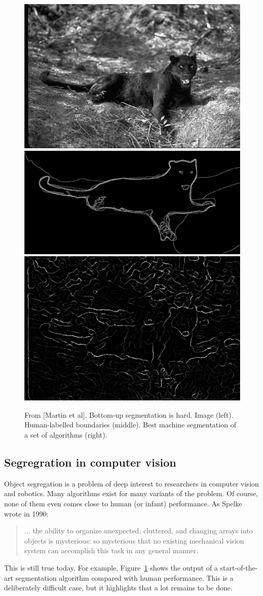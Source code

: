 \begin{figure}[t]

\centerline{
\includegraphics[width=0.3\columnwidth]{cat}
\includegraphics[width=0.3\columnwidth]{cat-human}
\includegraphics[width=0.3\columnwidth]{cat-machine}
}

\caption{
From [Martin et al].  Bottom-up segmentation is hard.
Image (left).  Human-labelled boundaries (middle).
Best machine segmentation of a set of algorithms (right).
}

\label{fig:segmentation-is-hard}

\end{figure}


\subsection{Segregration in computer vision}

Object segregation is a problem of deep interest to researchers in
computer vision and robotics.  Many algorithms exist for many variants
of the problem.  
Of course, none of them even comes close to human (or
infant) performance.  
As Spelke wrote in 1990:

\begin{quote}

... the ability to organize unexpected, cluttered, and
changing arrays into objects is mysterious: so mysterious
that no existing mechanical vision system can accomplish this task
in any general manner.
\cite{spelke90principles}

\end{quote}

\noindent
This is still true today.
For example, Figure~\ref{fig:segmentation-is-hard} shows the
output of a start-of-the-art segmentation algorithm
\cite{martin04learning} compared with human performance.  This is a
deliberately difficult case, but it highlights that a lot remains to
be done.


